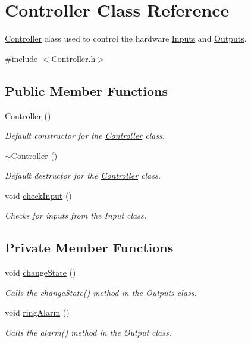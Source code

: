 \hypertarget{classController}{}\section{Controller Class Reference}
\label{classController}


\hyperlink{classController}{Controller} class used to control the hardware \hyperlink{classInputs}{Inputs} and \hyperlink{classOutputs}{Outputs}.  




{\ttfamily \#include $<$Controller.\+h$>$}

\subsection*{Public Member Functions}
\begin{DoxyCompactItemize}
\item 
\hyperlink{classController_a95c56822d667e94b031451729ce069a9}{Controller} ()
\begin{DoxyCompactList}\small\item\em Default constructor for the \hyperlink{classController}{Controller} class. \end{DoxyCompactList}\item 
\hyperlink{classController_a0ab87934c4f7a266cfdb86e0f36bc1b5}{$\sim$\+Controller} ()
\begin{DoxyCompactList}\small\item\em Default destructor for the \hyperlink{classController}{Controller} class. \end{DoxyCompactList}\item 
void \hyperlink{classController_aa11154b00ad33bb5a54f4e66bd279f23}{check\+Input} ()
\begin{DoxyCompactList}\small\item\em Checks for inputs from the Input class. \end{DoxyCompactList}\end{DoxyCompactItemize}
\subsection*{Private Member Functions}
\begin{DoxyCompactItemize}
\item 
void \hyperlink{classController_a783956d7ffd422c814c8d62926c38f5c}{change\+State} ()
\begin{DoxyCompactList}\small\item\em Calls the \hyperlink{classController_a783956d7ffd422c814c8d62926c38f5c}{change\+State()} method in the \hyperlink{classOutputs}{Outputs} class. \end{DoxyCompactList}\item 
void \hyperlink{classController_a051818aaff4b6e373881e1878faeaca7}{ring\+Alarm} ()
\begin{DoxyCompactList}\small\item\em Calls the alarm() method in the Output class. \end{DoxyCompactList}\end{DoxyCompactItemize}
